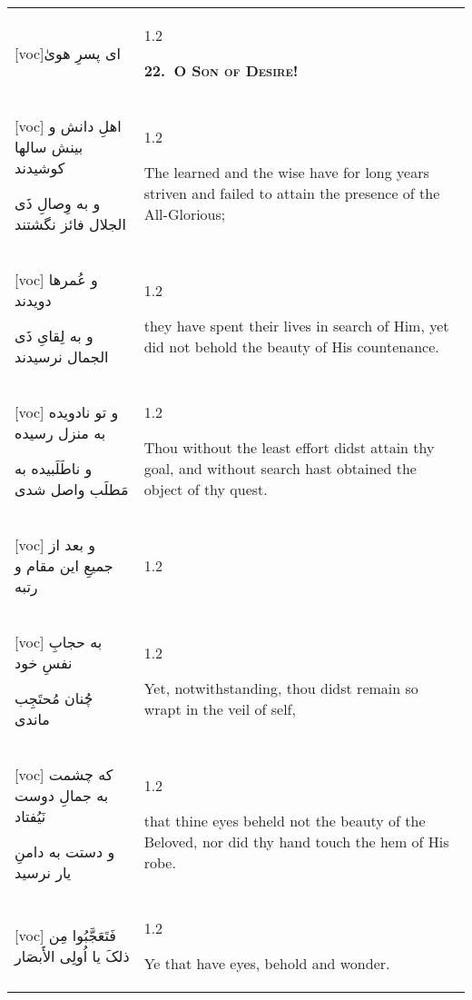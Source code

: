 \documentclass[11pt]{article}
\makeatletter
\newenvironment{orig}
  {\begin{farsi}[voc]}
  {\end{farsi}}
\newenvironment{trans}
  {\Large\begin{spacing}{1.2}\raggedright}
  {\end{spacing}}
\newenvironment{word}
  {\begin{tabular}[t]{p{2.75in}@{\hspace{3em}}p{2.875in}}}
  {\end{tabular}}
\newcommand{\ayat}[2]{\begin{orig}#1\end{orig} & \begin{trans}#2\end{trans}}
\newcommand{\heading}[2]{\textsc{\textbf{#1}} %
}
\makeatother
\begin{document}
\pagebreak

\begin{word}
\ayat{ای پسرِ هویٰ}{\heading{22.~O Son of Desire!}{}} \\ \ayat{
اهلِ دانش و بينش سالها کوشيدند

و به وِصالِ ذَی الجلال فائز نگشتند
}{The learned and the wise have for long years striven and failed to attain
  the presence of the All-Glorious;} \vspace{-1ex}\\ \ayat{
و عُمرها دويدند

و به لِقایِ ذَی الجمال نرسيدند
}{they have spent their lives in search of Him, yet did not behold the beauty
  of His countenance.} \vspace{-1ex}\\ \ayat{
و تو نادويده به منزل رسيده

و ناطَلَبيده به مَطلَب واصل شدی
}{Thou without the least effort didst attain thy goal, and without search hast
  obtained the object of thy quest.} \vspace{-1ex}\\ \ayat{
و بعد از جميعِ اين مقام و رتبه
}{} \vspace{-1ex}\\ \ayat{
به حجابِ نفسِ خود

چُنان مُحتَجِب ماندی
}{Yet, notwithstanding, thou didst remain so wrapt in the veil of
  self,} \\ \ayat{
که چشمت به جمالِ دوست نَيُفتاد

و دستت به دامنِ يار نرسيد
}{that thine eyes beheld not the beauty of the Beloved, nor did thy hand touch
  the hem of His robe.} \vspace{-1ex}\\ \ayat{
فَتَعَجَّبُوا مِن ذلکَ يا اُولِی الأَبصَار
}{Ye that have eyes, behold and wonder.}
\end{word}

\pagebreak
\end{document}
